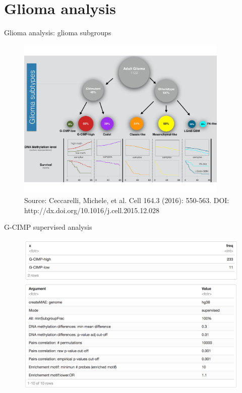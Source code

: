 \documentclass[slidestop,compress,11pt,xcolor=dvipsnames]{beamer}
\begin{document}
\section{Glioma analysis}


\begin{frame}{Glioma analysis: glioma subgroups}
\vspace{-0.5cm}
 \begin{figure}[ht!]
  \centering
  \includegraphics[width=0.9\textwidth]{glioma/figure1.pdf}{\tiny{\\Source: Ceccarelli, Michele, et al. Cell 164.3 (2016): 550-563. DOI: http://dx.doi.org/10.1016/j.cell.2015.12.028}}
 \end{figure}
\end{frame}

\begin{frame}{G-CIMP supervised analysis}

 \begin{figure}[ht!]
  \centering
  \includegraphics[width=1.0\textwidth]{glioma/groups.png}
  \includegraphics[width=1.0\textwidth]{glioma/arguments.png}
 \end{figure}
\end{frame}
\end{document}
